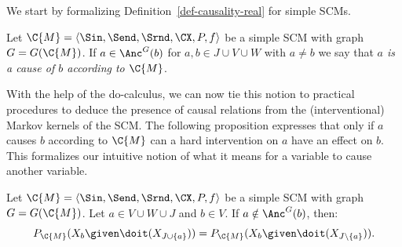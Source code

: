 We start by formalizing Definition~\ref{def-causality-real} for simple SCMs.
\begin{Def}
  Let $\C{M} = \langle \Sin, \Send, \Srnd, \CX, P, f \rangle$ be a simple SCM with graph $G = G(\C{M})$.
  If $a \in \Anc^G(b)$ for $a, b \in J \cup V \cup W$ with $a\ne b$ we say that \emph{$a$ is a cause of $b$ according to $\C{M}$}.
\end{Def}
With the help of the do-calculus, we can now tie this notion to practical procedures 
to deduce the presence of causal relations from the (interventional) Markov kernels of the SCM.
The following proposition expresses that only if $a$ causes $b$ according to $\C{M}$ can
a hard intervention on $a$ have an effect on $b$. This formalizes our intuitive notion of what it means for
a variable to cause another variable.
\begin{Prp}\label{prp:scm_causes_separation}
  Let $\C{M} = \langle \Sin, \Send, \Srnd, \CX, P, f \rangle$ be a simple SCM with graph $G = G(\C{M})$.
  Let $a \in V \cup W \cup J$ and $b \in V$.
  If $a \notin \Anc^G(b)$, then:
  $$P_{\C{M}}(X_b \given \doit(X_{J\cup \{a\}})) = P_{\C{M}}(X_b \given \doit(X_{J\setminus \{a\}})).$$
\end{Prp}
